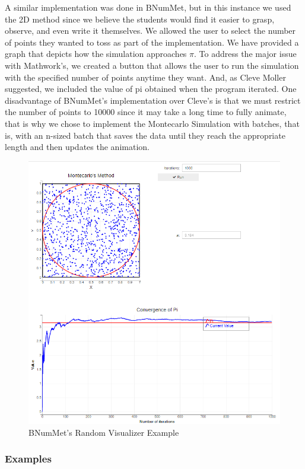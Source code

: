 A similar implementation was done in BNumMet, but in this instance we used the 2D method since we believe the students would find it easier to grasp, observe, and even write it themselves. We allowed the user to select the number of points they wanted to toss as part of the implementation. We have provided a graph that depicts how the simulation approaches $\pi$. To address the major issue with Mathwork's, we created a button that allows the user to run the simulation with the specified number of points anytime they want. And, as Cleve Moller suggested, we included the value of pi obtained when the program iterated. One disadvantage of BNumMet's implementation over Cleve's is that we must restrict the number of points to 10000 since it may take a long time to fully animate, that is why we chose to implement the Montecarlo Simulation with batches, that is, with an n-sized batch that saves the data until they reach the appropriate length and then updates the animation.
\begin{figure}[H]
    \centering
    \includegraphics[width=\textwidth]{Include/Images/Thesis/Development/Visualizers/RANDOMNESS/BNumMet.Random.Ex1.png}
    \caption{BNumMet's Random Visualizer Example}
    \label{fig:BNumMet's Random Visualizer Example}
\end{figure}
\subsubsection{Examples}
	
